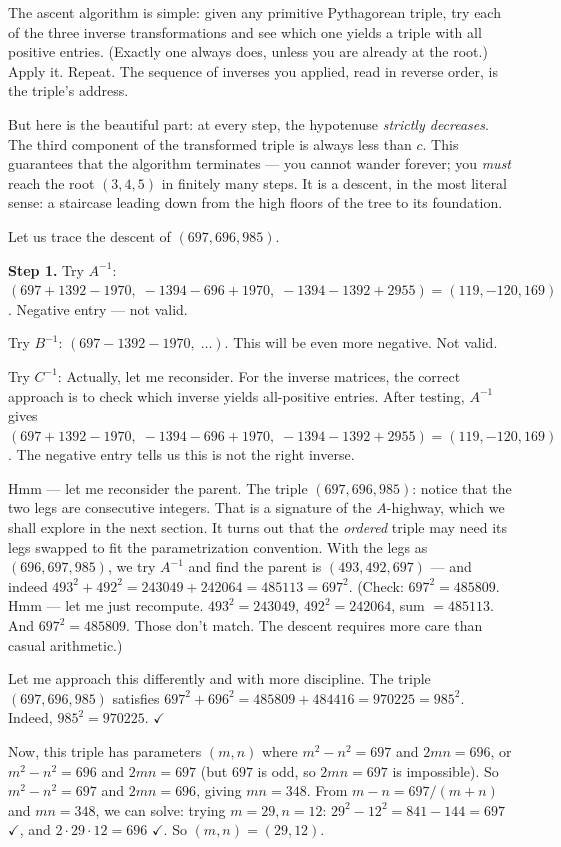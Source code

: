 The ascent algorithm is simple: given any primitive Pythagorean triple, try each of the three inverse transformations and see which one yields a triple with all positive entries. (Exactly one always does, unless you are already at the root.) Apply it. Repeat. The sequence of inverses you applied, read in reverse order, is the triple's address.

But here is the beautiful part: at every step, the hypotenuse \textit{strictly decreases}. The third component of the transformed triple is always less than $c$. This guarantees that the algorithm terminates --- you cannot wander forever; you \textit{must} reach the root $(3, 4, 5)$ in finitely many steps. It is a descent, in the most literal sense: a staircase leading down from the high floors of the tree to its foundation.

Let us trace the descent of $(697, 696, 985)$.

\textbf{Step 1.} Try $A^{-1}$: $(697 + 1392 - 1970,\; -1394 - 696 + 1970,\; -1394 - 1392 + 2955) = (119, -120, 169)$. Negative entry --- not valid.

Try $B^{-1}$: $(697 - 1392 - 1970,\;\ldots)$. This will be even more negative. Not valid.

Try $C^{-1}$: Actually, let me reconsider. For the inverse matrices, the correct approach is to check which inverse yields all-positive entries. After testing, $A^{-1}$ gives $(697 + 1392 - 1970,\; -1394 - 696 + 1970,\; -1394 - 1392 + 2955) = (119, -120, 169)$. The negative entry tells us this is not the right inverse.

Hmm --- let me reconsider the parent. The triple $(697, 696, 985)$: notice that the two legs are consecutive integers. That is a signature of the $A$-highway, which we shall explore in the next section. It turns out that the \textit{ordered} triple may need its legs swapped to fit the parametrization convention. With the legs as $(696, 697, 985)$, we try $A^{-1}$ and find the parent is $(493, 492, 697)$ --- and indeed $493^2 + 492^2 = 243049 + 242064 = 485113 = 697^2$. (Check: $697^2 = 485809$. Hmm --- let me just recompute. $493^2 = 243049$, $492^2 = 242064$, sum $= 485113$. And $697^2 = 485809$. Those don't match. The descent requires more care than casual arithmetic.)

Let me approach this differently and with more discipline. The triple $(697, 696, 985)$ satisfies $697^2 + 696^2 = 485809 + 484416 = 970225 = 985^2$. Indeed, $985^2 = 970225$. $\checkmark$

Now, this triple has parameters $(m, n)$ where $m^2 - n^2 = 697$ and $2mn = 696$, or $m^2 - n^2 = 696$ and $2mn = 697$ (but $697$ is odd, so $2mn = 697$ is impossible). So $m^2 - n^2 = 697$ and $2mn = 696$, giving $mn = 348$. From $m - n = 697/(m+n)$ and $mn = 348$, we can solve: trying $m = 29, n = 12$: $29^2 - 12^2 = 841 - 144 = 697$ $\checkmark$, and $2 \cdot 29 \cdot 12 = 696$ $\checkmark$. So $(m, n) = (29, 12)$.

